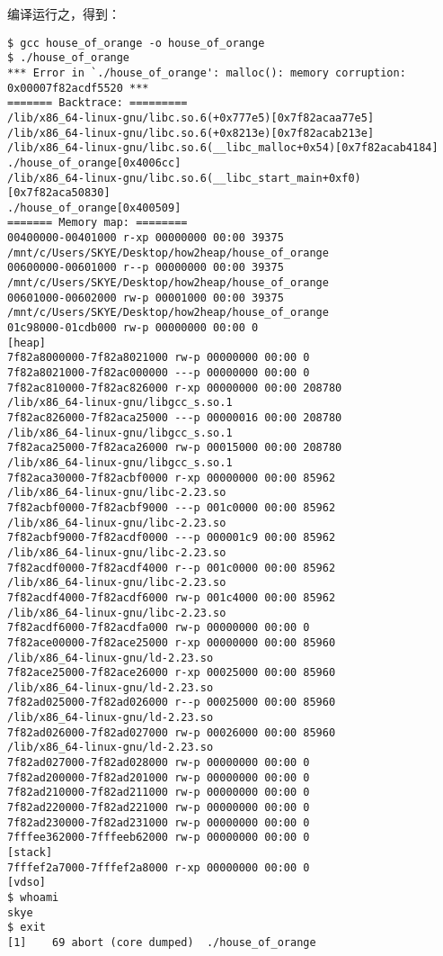 编译运行之，得到：
\begin{verbatim}
$ gcc house_of_orange -o house_of_orange
$ ./house_of_orange
*** Error in `./house_of_orange': malloc(): memory corruption: 0x00007f82acdf5520 ***
======= Backtrace: =========
/lib/x86_64-linux-gnu/libc.so.6(+0x777e5)[0x7f82acaa77e5]
/lib/x86_64-linux-gnu/libc.so.6(+0x8213e)[0x7f82acab213e]
/lib/x86_64-linux-gnu/libc.so.6(__libc_malloc+0x54)[0x7f82acab4184]
./house_of_orange[0x4006cc]
/lib/x86_64-linux-gnu/libc.so.6(__libc_start_main+0xf0)[0x7f82aca50830]
./house_of_orange[0x400509]
======= Memory map: ========
00400000-00401000 r-xp 00000000 00:00 39375                      /mnt/c/Users/SKYE/Desktop/how2heap/house_of_orange
00600000-00601000 r--p 00000000 00:00 39375                      /mnt/c/Users/SKYE/Desktop/how2heap/house_of_orange
00601000-00602000 rw-p 00001000 00:00 39375                      /mnt/c/Users/SKYE/Desktop/how2heap/house_of_orange
01c98000-01cdb000 rw-p 00000000 00:00 0                          [heap]
7f82a8000000-7f82a8021000 rw-p 00000000 00:00 0
7f82a8021000-7f82ac000000 ---p 00000000 00:00 0
7f82ac810000-7f82ac826000 r-xp 00000000 00:00 208780             /lib/x86_64-linux-gnu/libgcc_s.so.1
7f82ac826000-7f82aca25000 ---p 00000016 00:00 208780             /lib/x86_64-linux-gnu/libgcc_s.so.1
7f82aca25000-7f82aca26000 rw-p 00015000 00:00 208780             /lib/x86_64-linux-gnu/libgcc_s.so.1
7f82aca30000-7f82acbf0000 r-xp 00000000 00:00 85962              /lib/x86_64-linux-gnu/libc-2.23.so
7f82acbf0000-7f82acbf9000 ---p 001c0000 00:00 85962              /lib/x86_64-linux-gnu/libc-2.23.so
7f82acbf9000-7f82acdf0000 ---p 000001c9 00:00 85962              /lib/x86_64-linux-gnu/libc-2.23.so
7f82acdf0000-7f82acdf4000 r--p 001c0000 00:00 85962              /lib/x86_64-linux-gnu/libc-2.23.so
7f82acdf4000-7f82acdf6000 rw-p 001c4000 00:00 85962              /lib/x86_64-linux-gnu/libc-2.23.so
7f82acdf6000-7f82acdfa000 rw-p 00000000 00:00 0
7f82ace00000-7f82ace25000 r-xp 00000000 00:00 85960              /lib/x86_64-linux-gnu/ld-2.23.so
7f82ace25000-7f82ace26000 r-xp 00025000 00:00 85960              /lib/x86_64-linux-gnu/ld-2.23.so
7f82ad025000-7f82ad026000 r--p 00025000 00:00 85960              /lib/x86_64-linux-gnu/ld-2.23.so
7f82ad026000-7f82ad027000 rw-p 00026000 00:00 85960              /lib/x86_64-linux-gnu/ld-2.23.so
7f82ad027000-7f82ad028000 rw-p 00000000 00:00 0
7f82ad200000-7f82ad201000 rw-p 00000000 00:00 0
7f82ad210000-7f82ad211000 rw-p 00000000 00:00 0
7f82ad220000-7f82ad221000 rw-p 00000000 00:00 0
7f82ad230000-7f82ad231000 rw-p 00000000 00:00 0
7fffee362000-7fffeeb62000 rw-p 00000000 00:00 0                  [stack]
7fffef2a7000-7fffef2a8000 r-xp 00000000 00:00 0                  [vdso]
$ whoami
skye
$ exit
[1]    69 abort (core dumped)  ./house_of_orange
\end{verbatim}

